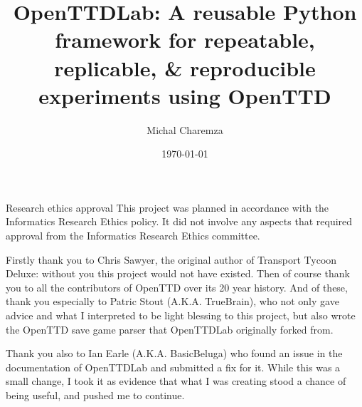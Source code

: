 \documentclass[logo,msc,dsti]{style/infthesis}    %
\begin{document}
\begin{preliminary}

\title{OpenTTDLab: A reusable Python framework for repeatable, replicable, \& reproducible experiments using OpenTTD}

\author{Michal Charemza}

\date{\today}


\maketitle

\newenvironment{ethics}
   {\begin{frontenv}{Research ethics approval}{\LARGE}}
   {\end{frontenv}\newpage}

\begin{ethics}
This project was planned in accordance with the Informatics Research
Ethics policy. It did not involve any aspects that required approval
from the Informatics Research Ethics committee.
\standarddeclaration
\end{ethics}

\begin{acknowledgements}

Firstly thank you to Chris Sawyer, the original author of Transport Tycoon Deluxe: without you this project would not have existed. Then of course thank you to all the contributors of OpenTTD over its 20 year history. And of these, thank you especially to Patric Stout (A.K.A. TrueBrain), who not only gave advice and what I interpreted to be light blessing to this project, but also wrote the OpenTTD save game parser that OpenTTDLab originally forked from.

Thank you also to Ian Earle (A.K.A. BasicBeluga) who found an issue in the documentation of OpenTTDLab and submitted a fix for it. While this was a small change, I took it as evidence that what I was creating stood a chance of being useful, and pushed me to continue.


\end{acknowledgements}
\end{preliminary}
\end{document}
